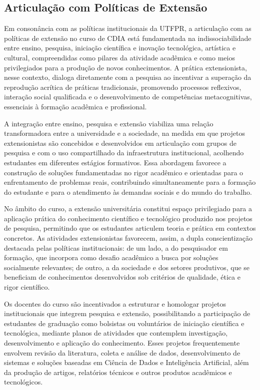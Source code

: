 \subsection{Articulação com Políticas de Extensão}

Em consonância com as políticas institucionais da UTFPR, a articulação com as políticas de extensão no curso de CDIA está fundamentada na indissociabilidade entre ensino, pesquisa, iniciação científica e inovação tecnológica, artística e cultural, compreendidas como pilares da atividade acadêmica e como meios privilegiados para a produção de novos conhecimentos. A prática extensionista, nesse contexto, dialoga diretamente com a pesquisa ao incentivar a superação da reprodução acrítica de práticas tradicionais, promovendo processos reflexivos, interação social qualificada e o desenvolvimento de competências metacognitivas, essenciais à formação acadêmica e profissional.

A integração entre ensino, pesquisa e extensão viabiliza uma relação transformadora entre a universidade e a sociedade, na medida em que projetos extensionistas são concebidos e desenvolvidos em articulação com grupos de pesquisa e com o uso compartilhado da infraestrutura institucional, acolhendo estudantes em diferentes estágios formativos. Essa abordagem favorece a construção de soluções fundamentadas no rigor acadêmico e orientadas para o enfrentamento de problemas reais, contribuindo simultaneamente para a formação do estudante e para o atendimento às demandas sociais e do mundo do trabalho.

No âmbito do curso, a extensão universitária constitui espaço privilegiado para a aplicação prática do conhecimento científico e tecnológico produzido nos projetos de pesquisa, permitindo que os estudantes articulem teoria e prática em contextos concretos. As atividades extensionistas favorecem, assim, a dupla conscientização destacada pelas políticas institucionais: de um lado, a do pesquisador em formação, que incorpora como desafio acadêmico a busca por soluções socialmente relevantes; de outro, a da sociedade e dos setores produtivos, que se beneficiam de conhecimentos desenvolvidos sob critérios de qualidade, ética e rigor científico.

Os docentes do curso são incentivados a estruturar e homologar projetos institucionais que integrem pesquisa e extensão, possibilitando a participação de estudantes de graduação como bolsistas ou voluntários de iniciação científica e tecnológica, mediante planos de atividades que contemplem investigação, desenvolvimento e aplicação do conhecimento. Esses projetos frequentemente envolvem revisão da literatura, coleta e análise de dados, desenvolvimento de sistemas e soluções baseadas em Ciência de Dados e Inteligência Artificial, além da produção de artigos, relatórios técnicos e outros produtos acadêmicos e tecnológicos.

